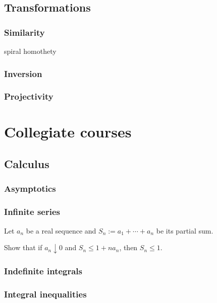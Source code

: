 \documentclass{../../large}
\begin{document}
\chapter{Transformations}
\section{Similarity}
spiral homothety

\section{Inversion}

\section{Projectivity}




\part{Collegiate courses}
\chapter{Calculus}



\section{Asymptotics}
\section{Infinite series}

\begin{prb}
Let $a_n$ be a real sequence and $S_n:=a_1+\cdots+a_n$ be its partial sum.
\begin{parts}
\item Show that if $a_n\downarrow0$ and $S_n\le1+na_n$, then $S_n\le1$.
\end{parts}
\end{prb}



\section{Indefinite integrals}
\section{Integral inequalities}
\end{document}
